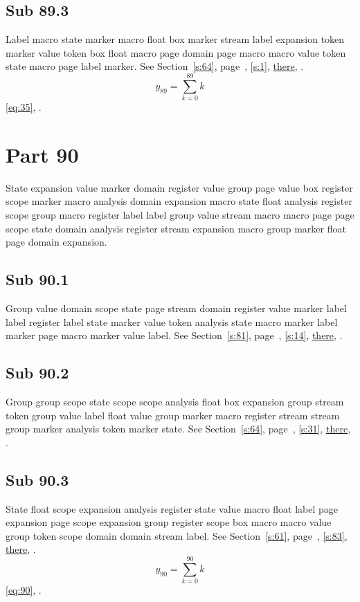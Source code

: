 \documentclass[11pt]{article}
\begin{document}
\subsection{Sub 89.3}\label{ss:89.3} Label macro state marker macro float box marker stream label expansion token marker value token box float macro page domain page macro macro value token state macro page label marker. See Section~\ref{s:64}, page~\pageref{ss:88.1}, \cref{s:1}, \hyperref[s:15]{there}, \cite{k105,k36}.
\begin{equation}y_{89}=\sum_{k=0}^{89}k\label{eq:89}\end{equation} \eqref{eq:35}, .
\section{Part 90}\label{s:90}
State expansion value marker domain register value group page value box register scope marker macro analysis domain expansion macro state float analysis register scope group macro register label label group value stream macro macro page page scope state domain analysis register stream expansion macro group marker float page domain expansion.
\subsection{Sub 90.1}\label{ss:90.1} Group value domain scope state page stream domain register value marker label label register label state marker value token analysis state macro marker label marker page macro marker value label. See Section~\ref{s:81}, page~\pageref{ss:17.1}, \cref{s:14}, \hyperref[s:97]{there}, \cite{k73,k112}.
\subsection{Sub 90.2}\label{ss:90.2} Group group scope state scope scope analysis float box expansion group stream token group value label float value group marker macro register stream stream group marker analysis token marker state. See Section~\ref{s:64}, page~\pageref{ss:75.1}, \cref{s:31}, \hyperref[s:100]{there}, \cite{k115,k83}.
\subsection{Sub 90.3}\label{ss:90.3} State float scope expansion analysis register state value macro float label page expansion page scope expansion group register scope box macro macro value group token scope domain domain stream label. See Section~\ref{s:61}, page~\pageref{ss:92.2}, \cref{s:83}, \hyperref[s:33]{there}, \cite{k110,k60}.
\begin{equation}y_{90}=\sum_{k=0}^{90}k\label{eq:90}\end{equation} \eqref{eq:90}, .
\end{document}
